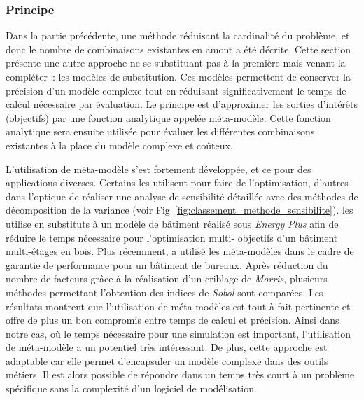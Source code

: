 \subsubsection{Principe} %
\label{ssub:principe}
Dans la partie précédente, une méthode réduisant la cardinalité du problème, et donc le
nombre de combinaisons existantes en amont a été décrite. Cette section présente une autre
approche ne se substituant pas à la première mais venant la compléter~: les modèles de
substitution. Ces modèles permettent de conserver la précision d’un modèle complexe tout
en réduisant significativement le temps de calcul nécessaire par évaluation. Le principe
est d’approximer les sorties d’intérêts (objectifs) par une fonction analytique appelée
méta-modèle. Cette fonction analytique sera ensuite utilisée pour évaluer les différentes
combinaisons existantes à la place du modèle complexe et coûteux.

L’utilisation de méta-modèle s’est fortement développée, et ce pour des applications
diverses. Certains les utilisent pour faire de l’optimisation, d’autres dans l’optique de
réaliser une analyse de sensibilité détaillée avec des méthodes de décomposition de la
variance (voir Fig~\ref{fig:classement_methode_sensibilite}). \textcite{Armand-Decker2015}
les utilise en substituts à un modèle de bâtiment réalisé sous \textit{Energy Plus} afin
de réduire le temps nécessaire pour l’optimisation multi- objectifs d’un bâtiment multi-étages
en bois. Plus récemment, \textcite{Faggianelli201761} a utilisé les méta-modèles
dans le cadre de garantie de performance pour un bâtiment de bureaux. Après réduction du
nombre de facteurs grâce à la réalisation d’un criblage de \textit{Morris}, plusieurs
méthodes permettant l’obtention des indices de \textit{Sobol} sont comparées. Les
résultats montrent que l’utilisation de méta-modèles est tout à fait pertinente et offre
de plus un bon compromis entre temps de calcul et précision. Ainsi dans notre cas, où le
temps nécessaire pour une simulation est important, l’utilisation de méta-modèle a un
potentiel très intéressant. De plus, cette approche est adaptable car elle permet
d’encapsuler un modèle complexe dans des outils métiers. Il est alors possible de répondre
dans un temps très court à un problème spécifique sans la complexité d’un logiciel de
modélisation.

